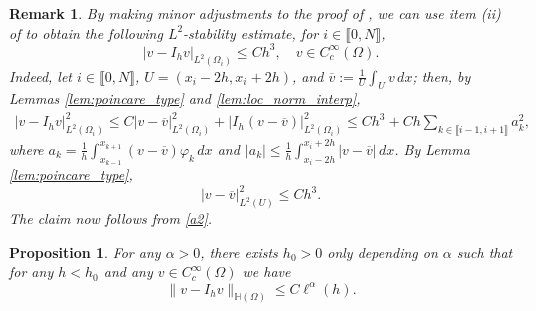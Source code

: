\documentclass[11 pt]{article}
\newcommand\inter[1]{\llbracket #1\rrbracket}
\newtheorem{remark}[theorem]{Remark}
\newtheorem{proposition}[theorem]{Proposition}
\numberwithin{equation}{section}
\begin{document}
\begin{remark}\label{rem:l2_stability}
By making minor adjustments to the proof of  , we can use item (ii) of  to obtain the following $L^2$-stability estimate, for $i\in\inter{0,N}$,
%
\begin{equation*}
    |v-I_hv|_{L^2(\Omega_i)} \leq C h^3, \quad  v\in C_c^\infty(\Omega).
\end{equation*}
Indeed, let $i\in\inter{0,N}$, $U=({x_i-2h},{x_{i}+2h})$, and $\overline{v}:=\frac{1}{U}\int_U v\, dx$; then, by Lemmas \ref{lem:poincare_type} and \ref{lem:loc_norm_interp},
\begin{align}
|v-I_hv|^2_{L^2(\Omega_i)}
\leq C|v-\overline{v}|_{L^2(\Omega_i)}^2 +|I_h(v-\overline{v})|^2_{L^2(\Omega_i)}
\leq Ch^3+Ch\sum_{k\in \inter{i-1,i+1}}a_k^2,\label{a2}
\end{align}
where $a_k=\frac{1}{h}\int_{x_{k-1}}^{x_{k+1}} (v-\overline{v})\varphi_k\, dx$ and $|a_k|\leq \frac{1}{h}\int_{x_i-2h}^{x_{i}+2h}|v-\overline{v}|\, dx$. By Lemma \ref{lem:poincare_type},
\begin{equation}
    |v-\overline{v}|_{L^2(U)}^2\leq Ch^3.
\end{equation}
The claim now follows from \eqref{a2}.
\end{remark}

\begin{proposition}\label{eq:estab_H_c_infty}
For any $\alpha>0$, there exists $h_0>0$ only depending on $\alpha$ such that for any $h<h_0$ and any $v\in C_c^\infty(\Omega)$ we have
%
\begin{equation}\label{eq:rate_H_c_infty}
    \|v-I_h v\|_{\mathbb H(\Omega)}\leq C\ell^\alpha(h).
\end{equation}
%
\end{proposition}
\end{document}
